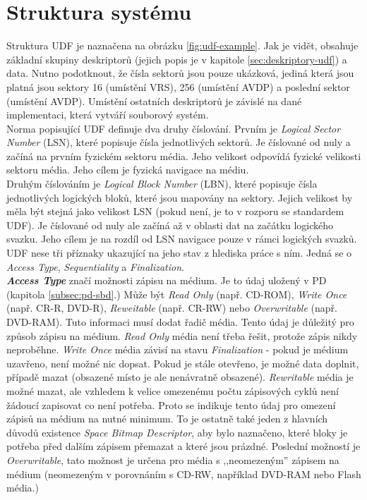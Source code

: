 \section{Struktura systému}
\label{sec:udf-struktura}
Struktura UDF je naznačena na obrázku \ref{fig:udf-example}. Jak je vidět, obsahuje základní skupiny deskriptorů (jejich popis je v kapitole \ref{sec:deskriptory-udf}) a data. Nutno podotknout, že čísla sektorů jsou pouze ukázková, jediná která jsou platná jsou sektory 16 (umístění VRS), 256 (umístění AVDP) a poslední sektor (umístění AVDP). Umístění ostatních deskriptorů je závislé na dané implementaci, která vytváří souborový systém.\\ 
Norma popisující UDF definuje dva druhy číslování. Prvním je \textit{Logical Sector Number} (LSN), které popisuje čísla jednotlivých sektorů. Je číslované od nuly a začíná na prvním fyzickém sektoru média. Jeho velikost odpovídá fyzické velikosti sektoru média. Jeho cílem je fyzická navigace na médiu.\\
Druhým číslováním je \textit{Logical Block Number} (LBN), které popisuje čísla jednotlivých logických bloků, které jsou mapovány na sektory. Jejich velikost by měla být stejná jako velikost LSN (pokud není, je to v rozporu se standardem UDF). Je číslované od nuly ale začíná až v oblasti dat na začátku logického svazku. Jeho cílem je na rozdíl od LSN navigace pouze v rámci logických svazků.\\
UDF nese tři příznaky ukazující na jeho stav z hlediska práce s ním. Jedná se o \textit{Access Type}, \textit{Sequentiality} a \textit{Finalization}.\\
\textbf{\textit{Access Type}} značí možnosti zápisu na médium. Je to údaj uložený v PD (kapitola \ref{subsec:pd-sbd}.) Může být \textit{Read Only} (např. CD-ROM), \textit{Write Once} (např. CR-R, DVD-R), \textit{Reweitable} (např. CR-RW) nebo \textit{Overwritable} (např. DVD-RAM). Tuto informaci musí dodat řadič média. Tento údaj je důležitý pro způsob zápisu na médium. \textit{Read Only} média není třeba řešit, protože zápis nikdy neproběhne. \textit{Write Once} média závisí na stavu \textit{Finalization} - pokud je médium uzavřeno, není možné nic dopsat. Pokud je stále otevřeno, je možné data doplnit, případě mazat (obsazené místo je ale nenávratně obsazené). \textit{Rewritable} média je možné mazat, ale vzhledem k velice omezenému počtu zápisových cyklů není žádoucí zapisovat co není potřeba. Proto se indikuje tento údaj pro omezení zápisů na médium na nutné minimum. To je ostatně také jeden z hlavních důvodů existence \textit{Space Bitmap Descriptor}, aby bylo naznačeno, které bloky je potřeba před dalším zápisem přemazat a které jsou prázdné. Poslední možností je \textit{Overwritable}, tato možnost je určena pro média s ,,neomezeným'' zápisem na médium (neomezeným v porovnáním s CD-RW, například DVD-RAM nebo Flash média.)\\
